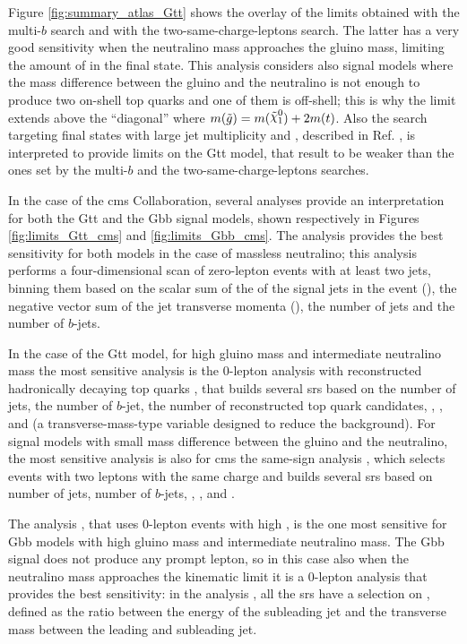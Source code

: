 Figure \ref{fig:summary_atlas_Gtt} shows the overlay of the limits obtained with the multi-$b$ search and with the two-same-charge-leptons search.
The latter has a very good sensitivity when the neutralino mass approaches the gluino mass,
limiting the amount of \met in the final state.
This analysis considers also signal models where the mass difference between the gluino and the neutralino 
is not enough to produce two on-shell top quarks and one of them is off-shell; this is why the limit extends above 
the ``diagonal'' where $m(\tilde{g}) = m(\ninoone) + 2 m(t)$.
Also the search targeting final states with large jet multiplicity and \met, described in Ref. \cite{SUSY-2016-13}, is interpreted to provide limits on the Gtt model, that result 
to be weaker than the ones set by the multi-$b$ and the two-same-charge-leptons searches. 

In the case of the \gls{cms} Collaboration, several analyses provide an interpretation for both the Gtt and 
the Gbb signal models, shown respectively in Figures \ref{fig:limits_Gtt_cms} and \ref{fig:limits_Gbb_cms}.
The \htmiss analysis \cite{Sirunyan:2017cwe} provides the best sensitivity for both models in the case of massless 
neutralino; this analysis performs a four-dimensional scan of zero-lepton events with at least two jets, binning them 
based on the scalar sum of the \pt of the signal jets in the event (\Ht), the negative vector sum of the jet transverse momenta (\htmiss), 
the number of jets and the number of $b$-jets. 

In the case of the Gtt model, for high gluino mass and intermediate neutralino mass the most sensitive analysis is
the 0-lepton analysis with reconstructed hadronically decaying top quarks \cite{Sirunyan:2017pjw}, 
that builds several \glspl{sr} based on the number of jets, the number of $b$-jet, the number of reconstructed top quark 
candidates, \met, \Ht, and \mttwo 
(a transverse-mass-type variable designed to reduce the \ttbar background). 
For signal models with small mass difference between the gluino and the neutralino, the most sensitive analysis 
is also for \gls{cms} the same-sign analysis \cite{Sirunyan:2017uyt}, which selects events with two leptons with 
the same charge and builds several \glspl{sr} based on number of jets, number of $b$-jets, \met, \Ht, and \mt. 

The \mttwo analysis \cite{Sirunyan:2017kqq}, that uses 0-lepton events with high \mttwo,
 is the one most sensitive for Gbb models with high gluino mass 
and intermediate neutralino mass. 
The Gbb signal does not produce any prompt lepton, so in this case also when the neutralino mass approaches the kinematic 
limit it is a 0-lepton analysis that provides the best sensitivity: 
in the \alphat analysis \cite{Sirunyan:2018vjp}, all the \glspl{sr} 
have a selection on \alphat, defined as the ratio between the energy of the subleading jet and the transverse mass
between the leading and subleading jet. 

